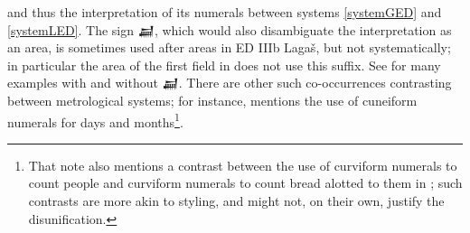 \documentclass[10pt, a4paper, twoside]{article}
\newcommand{\withnote}{n.}
\begin{document}
and thus the interpretation of its
numerals between systems \ref{systemGED} and \ref{systemLED}.
The sign {\xsuxfont 𒃷},
which would also disambiguate the interpretation as an area,
is sometimes used after areas in ED IIIb Lagaš, but not systematically;
in particular the area of the first field in \cite{P020054} does not use this suffix.
See \cite{Lecompte2020} for many examples with and without {\xsuxfont 𒃷}.
There are other such co-occurrences contrasting between metrological systems;
for instance, \cite[\pno~303 \withnote~686]{Krebernik1998} mentions
the use of cuneiform numerals for days and months\footnote{That
note also mentions a contrast between the use of curviform numerals to count people
and curviform numerals to count bread alotted to them in \cite{P010876}; such contrasts are more akin
to styling, and might not, on their own, justify the disunification.}.
\end{document}
